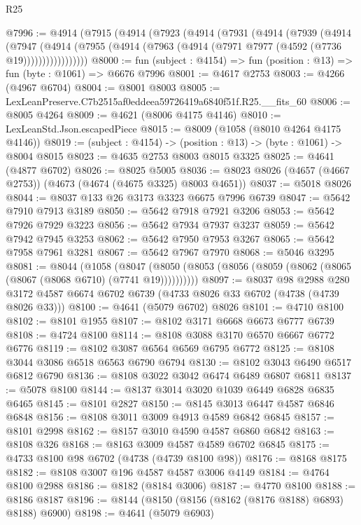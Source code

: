 \begin{lexlean}{R25}
\begin{coremodule}
@7996 := @4914
    (@7915
      (@4914
        (@7923
          (@4914
            (@7931
              (@4914
                (@7939
                  (@4914
                    (@7947
                      (@4914
                        (@7955 (@4914 (@7963 (@4914 (@7971 @7977 (@4592 (@7736 @19)))))))))))))))))
@8000 := fun (subject : @4154) => fun (position : @13) => fun (byte : @1061) => @6676 @7996
@8001 := @4617 @2753
@8003 := @4266 (@4967 @6704)
@8004 := @8001 @8003
@8005 := LexLeanPreserve.C7b2515af0eddeea59726419a6840f51f.R25.__fits_60
@8006 := @8005 @4264
@8009 := @4621 (@8006 @4175 @4146)
@8010 := LexLeanStd.Json.escapedPiece
@8015 := @8009 (@1058 (@8010 @4264 @4175 @4146))
@8019 := (subject : @4154) -> (position : @13) -> (byte : @1061) -> @8004 @8015
@8023 := @4635 @2753 @8003 @8015 @3325
@8025 := @4641 (@4877 @6702)
@8026 := @8025 @5005
@8036 := @8023 @8026 (@4657 (@4667 @2753)) (@4673 (@4674 (@4675 @3325) @8003 @4651))
@8037 := @5018 @8026
@8044 := @8037 @133 @26 @3173 @3323 @6675 @7996 @6739
@8047 := @5642 @7910 @7913 @3189
@8050 := @5642 @7918 @7921 @3206
@8053 := @5642 @7926 @7929 @3223
@8056 := @5642 @7934 @7937 @3237
@8059 := @5642 @7942 @7945 @3253
@8062 := @5642 @7950 @7953 @3267
@8065 := @5642 @7958 @7961 @3281
@8067 := @5642 @7967 @7970
@8068 := @5046 @3295
@8081 := @8044
    (@1058
      (@8047 (@8050 (@8053 (@8056 (@8059 (@8062 (@8065 (@8067 (@8068 @6710) (@7741 @19))))))))))
@8097 := @8037
    @98
    @2988
    @280
    @3172
    @4587
    @6674
    @6702
    @6739
    (@4733 @8026 @33 @6702 (@4738 (@4739 @8026 @33)))
@8100 := @4641 (@5079 @6702) @8026
@8101 := @4710 @8100
@8102 := @8101 @1955
@8107 := @8102 @3171 @6668 @6673 @6777 @6739
@8108 := @4724 @8100
@8114 := @8108 @3088 @3170 @6570 @6667 @6772 @6776
@8119 := @8102 @3087 @6564 @6569 @6795 @6772
@8125 := @8108 @3044 @3086 @6518 @6563 @6790 @6794
@8130 := @8102 @3043 @6490 @6517 @6812 @6790
@8136 := @8108 @3022 @3042 @6474 @6489 @6807 @6811
@8137 := @5078 @8100
@8144 := @8137 @3014 @3020 @1039 @6449 @6828 @6835 @6465
@8145 := @8101 @2827
@8150 := @8145 @3013 @6447 @4587 @6846 @6848
@8156 := @8108 @3011 @3009 @4913 @4589 @6842 @6845
@8157 := @8101 @2998
@8162 := @8157 @3010 @4590 @4587 @6860 @6842
@8163 := @8108 @326
@8168 := @8163 @3009 @4587 @4589 @6702 @6845
@8175 := @4733 @8100 @98 @6702 (@4738 (@4739 @8100 @98))
@8176 := @8168 @8175
@8182 := @8108 @3007 @196 @4587 @4587 @3006 @4149
@8184 := @4764 @8100 @2988
@8186 := @8182 (@8184 @3006)
@8187 := @4770 @8100
@8188 := @8186 @8187
@8196 := @8144 (@8150 (@8156 (@8162 (@8176 @8188) @6893) @8188) @6900)
@8198 := @4641 (@5079 @6903)

\end{coremodule}
\end{lexlean}
